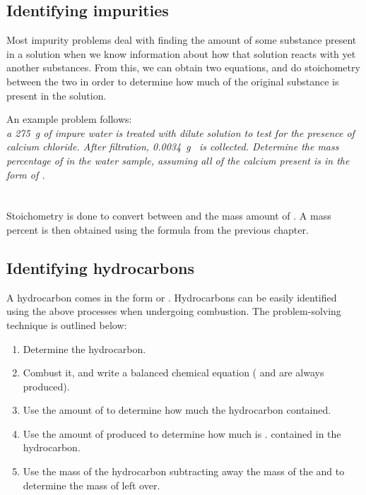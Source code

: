 \subsection{Identifying impurities}

Most impurity problems deal with finding the amount of some substance present in
a solution when we know information about how that solution reacts with yet
another substances. From this, we can obtain two equations, and do stoichometry
between the two in order to determine how much of the original substance is
present in the solution.

An example problem follows:\\

\textit{a \SI{275}{\gram} of impure water is treated with dilute 
  solution to test for the presence of calcium chloride. After filtration,
\SI{0.0034}{\gram {}} is collected. Determine the mass percentage of
 in the water sample, assuming all of the calcium present is in the
form of .}\\

\\
\\

Stoichometry is done to convert between  and the mass amount of
. A mass percent is then obtained using the formula from the previous
chapter.

\subsection{Identifying hydrocarbons}
A hydrocarbon comes in the form  or . Hydrocarbons can
be easily identified using the above processes when undergoing combustion. The
problem-solving technique is outlined below:

\begin{enumerate}
  \item Determine the hydrocarbon.
  \item Combust it, and write a balanced chemical equation ( and
     are always produced).
  \item Use the amount of  to determine how much  the hydrocarbon
    contained.
  \item Use the amount of  produced to determine how much  is
.    contained in the hydrocarbon.
  \item Use the mass of the hydrocarbon subtracting away the mass of the 
    and  to determine the mass of  left over.
\end{enumerate}

